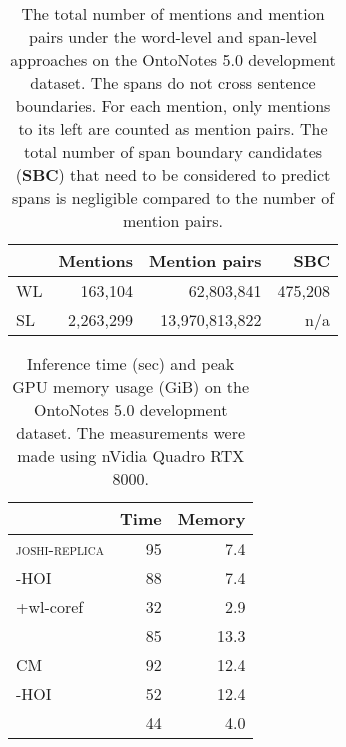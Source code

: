 \documentclass[11pt]{article}
\begin{document}
\begin{table} \centering
    \begin{tabular}{lrrr}
        \hline
        & \textbf{Mentions} & \textbf{Mention pairs} & \textbf{SBC} \\ \hline

        WL  &   163,104 &     62,803,841    & 475,208   \\
        SL  & 2,263,299 & 13,970,813,822    & n/a       \\
        
        \hline
    \end{tabular}
    \caption{The total number of mentions and mention pairs under the word-level and span-level approaches on the OntoNotes 5.0 development dataset. The spans do not cross sentence boundaries. For each mention, only mentions to its left are counted as mention pairs. The total number of span boundary candidates (\textbf{SBC}) that need to be considered to predict spans is negligible compared to the number of mention pairs. }
    \label{table_speed_theoretical}
\end{table}
 \begin{table} \centering
    \begin{tabular}{lrr}
        \hline
        & \textbf{Time} & \textbf{Memory} \\ \hline

        \textsc{joshi-replica}      & 95    & 7.4   \\
        \hspace{5pt} -HOI           & 88    & 7.4   \\
        \hspace{15pt} +wl-coref     & 32    & 2.9   \\
        
        \hline
        
        \citet{joshi-etal-2020-spanbert}    & 85    & 13.3  \\
        \citet{xu-choi-2020-revealing} CM   & 92    & 12.4  \\
        \hspace{5pt} -HOI                   & 52    & 12.4  \\
        \citet{kirstain-etal-2021-no-span}  & 44    & 4.0   \\
        
        \hline
    \end{tabular}
    \caption{Inference time (sec) and peak GPU memory usage (GiB) on the OntoNotes 5.0 development dataset. The measurements were made using nVidia Quadro RTX 8000. }
    \label{table_speed_measurements}
\end{table}
 
\end{document}
